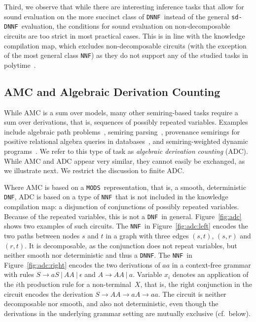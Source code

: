 \documentclass{article}
\theoremstyle{plain}
\theoremstyle{definition}
\newcommand{\NNF}{{\tt NNF}}
\newcommand{\DNF}{{\tt DNF}}
\newcommand{\DNNF}{{\tt DNNF}}
\newcommand{\sdDNNF}{{\tt sd-DNNF}}
\newcommand{\MODS}{{\tt MODS}}
\begin{document}
Third, we observe that while there are interesting inference tasks
that allow for sound evaluation on the more succinct class of \DNNF\
instead of the general \sdDNNF\ evaluation, the conditions for sound
evaluation on non-decomposable circuits are too strict in most
practical cases. 
This is in line with the knowledge compilation map,
which excludes non-decomposable circuits (with the exception of the
most general class \NNF) as they do not support any of the 
studied tasks in polytime~\citep{darwiche2002knowledge}. 


\subsection{AMC and Algebraic Derivation Counting}\label{sec:amcapp}
While AMC is a sum over models, many other semiring-based tasks
require a 
sum over derivations, that is, sequences of possibly repeated variables. Examples include 
algebraic path
problems~\citep{baras2010path}, semiring
parsing~\citep{Goodman99}, provenance semirings for positive
relational algebra queries in databases~\citep{Green2007}, and
semiring-weighted dynamic programs~\citep{Eisner05}. 
We refer to this type of task as \emph{algebraic derivation
  counting} (ADC). While AMC and ADC appear very similar, they cannot
easily be exchanged, as we illustrate next. We restrict the
discussion to finite ADC.

Where AMC is based on a \MODS\ representation, that is, a smooth,
deterministic \DNF, ADC is based on a type of \NNF\ that is not
included in the knowledge compilation map: a disjunction of
conjunctions  of possibly repeated variables. Because of the repeated
variables, this is not a \DNF\ in general.   Figure~\ref{fig:adc}
shows two examples of such circuits. The \NNF\ in Figure~\ref{fig:adc:left} encodes the two paths between
nodes $s$ and $t$ in a graph with three edges $(s,t)$, $(s,r)$ and
$(r,t)$. It  is decomposable, as the conjunction does not repeat
variables, but neither smooth nor deterministic and thus a \DNNF. The \NNF\ in Figure~\ref{fig:adc:right} encodes the two derivations of $aa$ in a context-free grammar
with rules $S\rightarrow aS ~|~ AA ~|~ \epsilon$ and $A\rightarrow AA
~|~ a$. Variable $x_i$ denotes an application of 
the $i$th production rule for a non-terminal~$X$, that is, the right
conjunction in the circuit encodes the derivation $S\rightarrow AA
\rightarrow aA \rightarrow aa$. 
The circuit  is neither decomposable nor smooth, and  also not
deterministic, even though the derivations in the underlying grammar
setting are mutually exclusive (cf.~below). 
\end{document}
